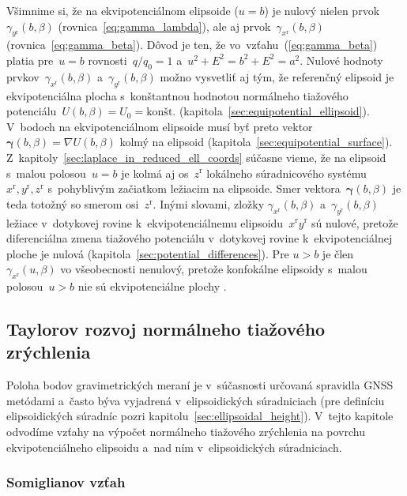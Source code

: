 \documentclass[a4paper, 12pt]{book}
\begin{document}
Všimnime si, že na ekvipotenciálnom elipsoide ($u = b$) je nulový nielen 
prvok~$\gamma_{y^\mathrm{r}}(b, \beta)$ (rovnica~\ref{eq:gamma_lambda}), ale aj 
prvok~$\gamma_{x^\mathrm{r}}(b, \beta)$ (rovnica~\ref{eq:gamma_beta}).  Dôvod 
je ten, že vo~vzťahu~(\ref{eq:gamma_beta}) platia pre~$u = b$ rovnosti~$q 
\slash q_0 = 1$ a~$u^2 + E^2 = b^2 + E^2 = a^2$.  Nulové hodnoty 
prvkov~$\gamma_{x^\mathrm{r}}(b, \beta)$ a~$\gamma_{y^\mathrm{r}}(b, \beta)$ 
možno vysvetliť aj tým, že referenčný elipsoid je ekvipotenciálna plocha 
s~konštantnou hodnotou normálneho tiažového potenciálu~$U(b, \beta) = U_0 
= \textrm{kon\v{s}t.}$
(kapitola~\ref{sec:equipotential_ellipsoid}).  V~bodoch na ekvipotenciálnom 
elipsoide musí byť preto vektor~$\boldsymbol \gamma(b, \beta) = \nabla U(b, 
\beta)$ kolmý na elipsoid (kapitola~\ref{sec:equipotential_surface}).  
Z~kapitoly~\ref{sec:laplace_in_reduced_ell_coords} súčasne vieme, že na 
elipsoid s~malou polosou~$u = b$ je kolmá aj os~$z^\mathrm{r}$ lokálneho 
súradnicového systému~$x^\mathrm{r}, y^\mathrm{r}, z^\mathrm{r}$ s~pohyblivým 
začiatkom ležiacim na elipsoide.  Smer vektora~$\boldsymbol \gamma(b, \beta)$ 
je teda totožný so smerom osi~$z^\mathrm{r}$.  Inými slovami, zložky 
$\gamma_{x^\mathrm{r}}(b, \beta)$ a~$\gamma_{y^\mathrm{r}}(b, \beta)$ ležiace 
v~dotykovej rovine k~ekvipotenciálnemu elipsoidu~$x^\mathrm{r} y^\mathrm{r}$ sú 
nulové, pretože diferenciálna zmena tiažového potenciálu v~dotykovej rovine 
k~ekvipotenciálnej ploche je nulová (kapitola~\ref{sec:potential_differences}).  
Pre $u > b$ je člen $\gamma_{x^\mathrm{r}}(u, \beta)$ vo všeobecnosti nenulový, 
pretože konfokálne elipsoidy s~malou polosou~$u > b$ nie sú ekvipotenciálne 
plochy \parencite{MoritzPhysicalGeodesy}.



\subsection{Taylorov rozvoj normálneho tiažového zrýchlenia}
\label{sec:normal_gravity_taylor}

Poloha bodov gravimetrických meraní je v~súčasnosti určovaná spravidla GNSS 
metódami a~často býva vyjadrená v~elipsoidických súradniciach (pre definíciu 
elipsoidických súradníc pozri kapitolu~\ref{sec:ellipsoidal_height}).  V~tejto 
kapitole odvodíme vzťahy na výpočet normálneho tiažového zrýchlenia na povrchu 
ekvipotenciálneho elipsoidu a~nad ním v~elipsoidických súradniciach.

\subsubsection{Somiglianov vzťah}
\label{sec:somigliana}
\end{document}
